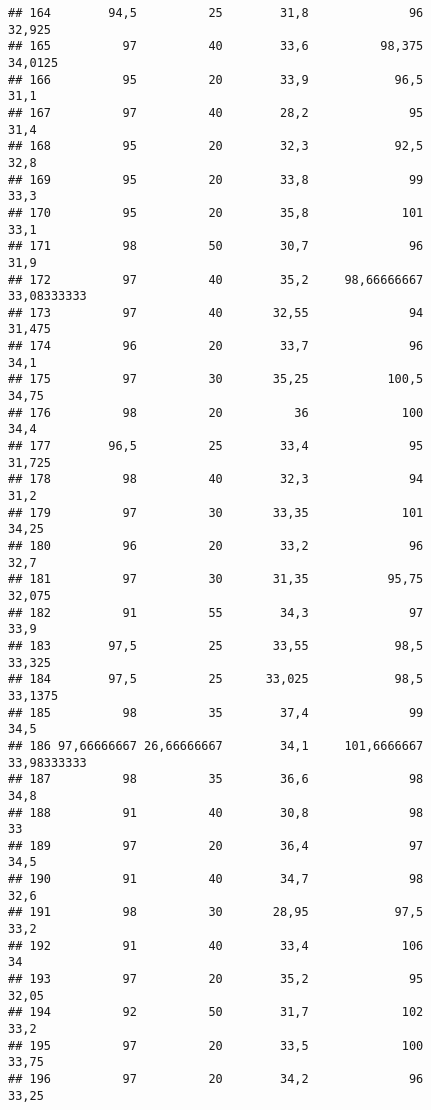 \documentclass[
]{article}
\begin{document}
\begin{verbatim}
## 164        94,5          25        31,8              96               32,925
## 165          97          40        33,6          98,375              34,0125
## 166          95          20        33,9            96,5                 31,1
## 167          97          40        28,2              95                 31,4
## 168          95          20        32,3            92,5                 32,8
## 169          95          20        33,8              99                 33,3
## 170          95          20        35,8             101                 33,1
## 171          98          50        30,7              96                 31,9
## 172          97          40        35,2     98,66666667          33,08333333
## 173          97          40       32,55              94               31,475
## 174          96          20        33,7              96                 34,1
## 175          97          30       35,25           100,5                34,75
## 176          98          20          36             100                 34,4
## 177        96,5          25        33,4              95               31,725
## 178          98          40        32,3              94                 31,2
## 179          97          30       33,35             101                34,25
## 180          96          20        33,2              96                 32,7
## 181          97          30       31,35           95,75               32,075
## 182          91          55        34,3              97                 33,9
## 183        97,5          25       33,55            98,5               33,325
## 184        97,5          25      33,025            98,5              33,1375
## 185          98          35        37,4              99                 34,5
## 186 97,66666667 26,66666667        34,1     101,6666667          33,98333333
## 187          98          35        36,6              98                 34,8
## 188          91          40        30,8              98                   33
## 189          97          20        36,4              97                 34,5
## 190          91          40        34,7              98                 32,6
## 191          98          30       28,95            97,5                 33,2
## 192          91          40        33,4             106                   34
## 193          97          20        35,2              95                32,05
## 194          92          50        31,7             102                 33,2
## 195          97          20        33,5             100                33,75
## 196          97          20        34,2              96                33,25

\end{verbatim}
\end{document}
